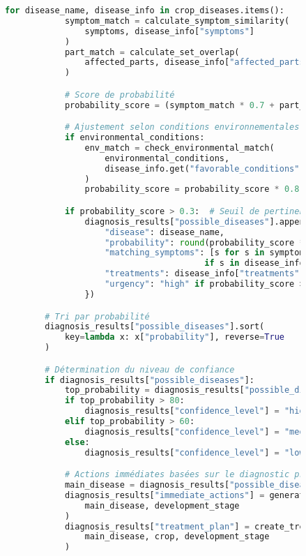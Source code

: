 \begin{figure}[h]
\begin{lstlisting}[language=Python, caption=Implémentation d'outils spécialisés pour l'agriculture]
        for disease_name, disease_info in crop_diseases.items():
            symptom_match = calculate_symptom_similarity(
                symptoms, disease_info["symptoms"]
            )
            part_match = calculate_set_overlap(
                affected_parts, disease_info["affected_parts"]
            )

            # Score de probabilité
            probability_score = (symptom_match * 0.7 + part_match * 0.3)

            # Ajustement selon conditions environnementales
            if environmental_conditions:
                env_match = check_environmental_match(
                    environmental_conditions,
                    disease_info.get("favorable_conditions", {})
                )
                probability_score = probability_score * 0.8 + env_match * 0.2

            if probability_score > 0.3:  # Seuil de pertinence
                diagnosis_results["possible_diseases"].append({
                    "disease": disease_name,
                    "probability": round(probability_score * 100, 1),
                    "matching_symptoms": [s for s in symptoms
                                        if s in disease_info["symptoms"]],
                    "treatments": disease_info["treatments"],
                    "urgency": "high" if probability_score > 0.7 else "medium"
                })

        # Tri par probabilité
        diagnosis_results["possible_diseases"].sort(
            key=lambda x: x["probability"], reverse=True
        )

        # Détermination du niveau de confiance
        if diagnosis_results["possible_diseases"]:
            top_probability = diagnosis_results["possible_diseases"][0]["probability"]
            if top_probability > 80:
                diagnosis_results["confidence_level"] = "high"
            elif top_probability > 60:
                diagnosis_results["confidence_level"] = "medium"
            else:
                diagnosis_results["confidence_level"] = "low"

            # Actions immédiates basées sur le diagnostic principal
            main_disease = diagnosis_results["possible_diseases"][0]
            diagnosis_results["immediate_actions"] = generate_immediate_actions(
                main_disease, development_stage
            )
            diagnosis_results["treatment_plan"] = create_treatment_plan(
                main_disease, crop, development_stage
            )


\end{lstlisting}
\end{figure}
